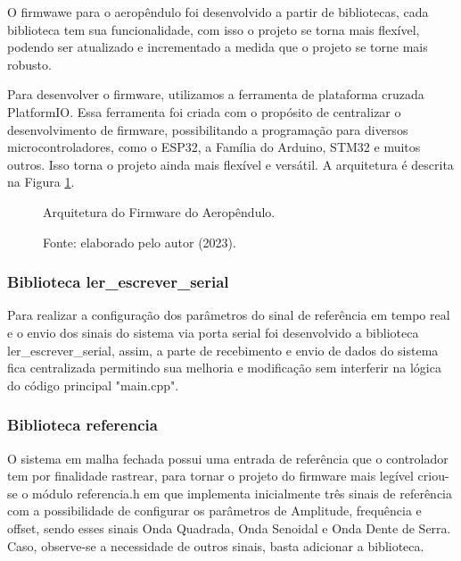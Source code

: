 O firmwawe para o aeropêndulo foi desenvolvido a partir de bibliotecas, cada biblioteca tem sua funcionalidade, com isso o projeto se torna mais flexível, podendo ser atualizado e incrementado a medida que o projeto se torne mais robusto. 

Para desenvolver o firmware, utilizamos a ferramenta de plataforma cruzada PlatformIO. Essa ferramenta foi criada com o propósito de centralizar o desenvolvimento de firmware, possibilitando a programação para diversos microcontroladores, como o ESP32, a Família do Arduino, STM32 e muitos outros. Isso torna o projeto ainda mais flexível e versátil. A arquitetura é descrita na Figura \ref{fig3:image_16}.


\begin{figure}[!h]
	\centering
	\caption{Arquitetura do Firmware do Aeropêndulo.}
	\caption*{Fonte: elaborado pelo autor (2023).}
	\label{fig3:image_16}
\end{figure}


\subsubsection{Biblioteca ler\_escrever\_serial}

Para realizar a configuração dos parâmetros do sinal de referência em tempo real e o envio dos sinais do sistema via porta serial foi desenvolvido a biblioteca ler\_escrever\_serial, assim, a parte de recebimento e envio de dados do sistema fica centralizada permitindo sua melhoria e modificação sem interferir na lógica do código principal "main.cpp".

\subsubsection{Biblioteca referencia}

O sistema em malha fechada possui uma entrada de referência que o controlador tem por finalidade rastrear, para tornar o projeto do firmware mais legível criou-se o módulo referencia.h em que implementa inicialmente três sinais de referência com a possibilidade de configurar os parâmetros de Amplitude, frequência e offset, sendo esses sinais Onda Quadrada, Onda Senoidal e Onda Dente de Serra. Caso, observe-se a necessidade de outros sinais, basta adicionar a biblioteca.

